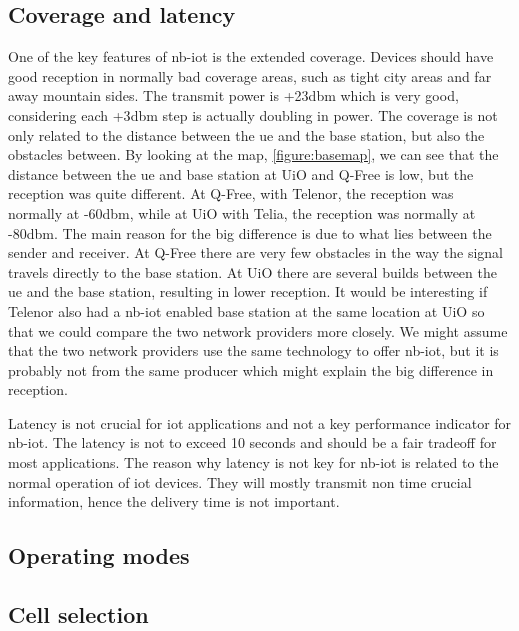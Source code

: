 \documentclass[USenglish]{ifimaster}  %
\begin{document}
\subsection{Coverage and latency}
One of the key features of \acrshort{nb-iot} is the extended coverage. Devices should have good reception in normally bad coverage areas, such as tight city areas and far away mountain sides. The transmit power is +23\acrshort{dbm} which is very good, considering each +3\acrshort{dbm} step is actually doubling in power. The coverage is not only related to the distance between the \acrshort{ue} and the base station, but also the obstacles between. By looking at the map, \vref{figure:basemap}, we can see that the distance between the \acrshort{ue} and base station at UiO and Q-Free is low, but the reception was quite different. At Q-Free, with Telenor, the reception was normally at -60\acrshort{dbm}, while at UiO with Telia, the reception was normally at -80\acrshort{dbm}. The main reason for the big difference is due to what lies between the sender and receiver. At Q-Free there are very few obstacles in the way the signal travels directly to the base station. At UiO there are several builds between the \acrshort{ue} and the base station, resulting in lower reception. It would be interesting if Telenor also had a \acrshort{nb-iot} enabled base station at the same location at UiO so that we could compare the two network providers more closely. We might assume that the two network providers use the same technology to offer \acrshort{nb-iot}, but it is probably not from the same producer which might explain the big difference in reception.

Latency is not crucial for \acrshort{iot} applications and not a key performance indicator for \acrshort{nb-iot}. The latency is not to exceed 10 seconds and should be a fair tradeoff for most applications. The reason why latency is not key for \acrshort{nb-iot} is related to the normal operation of \acrshort{iot} devices. They will mostly transmit non time crucial information, hence the delivery time is not important. 

\subsection{Operating modes}

\subsection{Cell selection}
\end{document}
